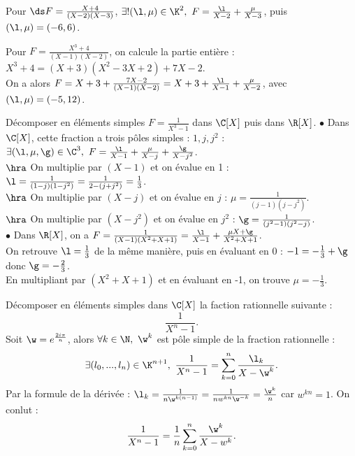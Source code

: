 \documentclass[11pt]{article}
\begin{document}
\begin{ex}{}{}
    Pour $\ds F=\frac{X+4}{(X-2)(X-3)}$, $\exists!(\l,\mu)\in\K^2, ~ F=\frac{\l}{X-2}+\frac{\mu}{X-3}$, puis $(\l,\mu)=(-6,6)$.
\end{ex}

\begin{ex}{}{}
    Pour $F=\frac{X^3+4}{(X-1)(X-2)}$, on calcule la partie entière : $X^3+4=(X+3)(X^2-3X+2)+7X-2$.\\
    On a alors $F=X+3+\frac{7X-2}{(X-1)(X-2)}=X+3+\frac{\l}{X-1}+\frac{\mu}{X-2}$, avec $(\l,\mu)=(-5,12)$.
\end{ex}

\vspace*{-0.8cm}

\begin{ex}{}{}
    Décomposer en éléments simples $F=\frac{1}{X^3-1}$ dans $\C[X]$ puis dans $\R[X]$.
    \tcblower
    $\bullet$ Dans $\C[X]$, cette fraction a trois pôles simples : $1,j,j^2$ : $\exists(\l,\mu,\g)\in\C^3, ~ F=\frac{\l}{X-1}+\frac{\mu}{X-j}+\frac{\g}{X-j^2}$.\\
    $\hra$ On multiplie par $(X-1)$ et on évalue en 1 : $\l = \frac{1}{(1-j)(1-j^2)}=\frac{1}{2-(j+j^2)}=\frac{1}{3}$.\\
    $\hra$ On multiplie par $(X-j)$ et on évalue en $j$ : $\mu = \frac{1}{(j-1)(j-j^2)}$.\\
    $\hra$ On multiplie par $(X-j^2)$ et on évalue en $j^2$ : $\g=\frac{1}{(j^2-1)(j^2-j)}$.\\
    $\bullet$ Dans $\R[X]$, on a $F=\frac{1}{(X-1)(X^2+X+1)}=\frac{\l}{X-1} + \frac{\mu X + \g}{X^2+X+1}$.\\
    On retrouve $\l=\frac{1}{3}$ de la même manière, puis en évaluant en $0$ : $-1 = -\frac{1}{3} + \g$ donc $\g = -\frac{2}{3}$.\\
    En multipliant par $(X^2+X+1)$ et en évaluant en -1, on trouve $\mu = -\frac{1}{3}$.
\end{ex}

\vspace*{-0.8cm}

\begin{exercice}{}{}
    Décomposer en éléments simples dans $\C[X]$ la faction rationnelle suivante :
    \begin{equation*}
        \frac{1}{X^n-1}.
    \end{equation*}
    \tcblower
    Soit $\w=e^{\frac{2i\pi}{n}}$, alors $\forall k \in \N, ~ \w^k$ est pôle simple de la fraction rationnelle :
    \begin{equation*}
        \exists (l_0,...,l_n) \in \K^{n+1}, ~ \frac{1}{X^n - 1} = \sum_{k=0}^n \frac{\l_k}{X-\w^k}.
    \end{equation*}
    Par la formule de la dérivée : $\l_k = \frac{1}{n\w^{k(n-1)}}=\frac{1}{nw^{kn}\w^{-k}}=\frac{\w^k}{n}$ car $w^{kn}=1$. On conlut :
    \begin{equation*}
        \frac{1}{X^n-1} = \frac{1}{n}\sum_{k=0}^n\frac{\w^k}{X-w^k}.
    \end{equation*}
\end{exercice}
\end{document}
